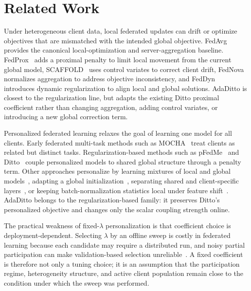 \documentclass[letterpaper]{article} %
\begin{document}
\section{Related Work}

Under heterogeneous client data, local federated updates can drift or
optimize objectives that are mismatched with the intended global
objective. FedAvg~\cite{mcmahan2017communication} provides the
canonical local-optimization and server-aggregation baseline.
FedProx~\cite{li2020federated} adds a proximal penalty to limit local
movement from the current global model,
SCAFFOLD~\cite{karimireddy2020scaffold} uses control variates to
correct client drift, FedNova~\cite{wang2020fednova} normalizes
aggregation to address objective inconsistency, and
FedDyn~\cite{acar2021feddyn} introduces dynamic regularization to
align local and global solutions. AdaDitto is closest to the
regularization line, but adapts the existing Ditto proximal coefficient
rather than changing aggregation, adding control variates, or
introducing a new global correction term.

Personalized federated learning relaxes the goal of learning one model
for all clients. Early federated multi-task methods such as
MOCHA~\cite{smith2017federated} treat clients as related but distinct
tasks. Regularization-based methods such as
pFedMe~\cite{dinh2020personalized} and Ditto~\cite{li2021ditto}
couple personalized models to shared global structure through a penalty
term. Other approaches personalize by learning mixtures of local and
global models~\cite{deng2020adaptive}, adapting a global
initialization~\cite{fallah2020personalized}, separating shared and
client-specific layers~\cite{arivazhagan2019federated,collins2021exploiting},
or keeping batch-normalization statistics local under feature
shift~\cite{li2021fedbn}. AdaDitto belongs to the
regularization-based family: it preserves Ditto's personalized
objective and changes only the scalar coupling strength online.

The practical weakness of fixed-$\lambda$ personalization is that
coefficient choice is deployment-dependent. Selecting $\lambda$ by an
offline sweep is costly in federated learning because each candidate
may require a distributed run, and noisy partial participation can make
validation-based selection unreliable~\cite{kuo2023noisy,wang2023fedhpo}.
A fixed coefficient is therefore not only a tuning choice; it is an
assumption that the participation regime, heterogeneity structure, and
active client population remain close to the condition under which the
sweep was performed.
\end{document}
